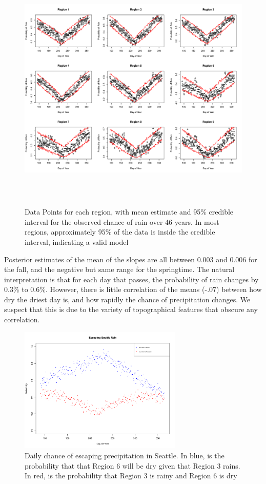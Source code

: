 \documentclass{article}
\begin{document}
\begin{figure}
\centering
\includegraphics[width = .8\textwidth, height = 12cm]{AllRegionPosterior}
\caption{Data Points for each region, with mean estimate and 95\% credible interval for the observed chance of rain over 46 years. In most regions, approximately 95\% of the data is inside the credible interval, indicating a valid model}
\label{fig:9by9}
\end{figure}
Posterior estimates of the mean of the slopes are all between 0.003 and 0.006 for the fall, and the negative but same range for the springtime. The natural interpretation is that for each day that passes, the probability of rain changes by 0.3\% to 0.6\%. However, there is little correlation of the means (-.07) between how dry the driest day is, and how rapidly the chance of precipitation changes. We suspect that this is due to the variety of topographical features that obscure any correlation. 

\begin{figure}
\centering
\includegraphics[width = .4\textwidth, height = 6cm]{Model2EscapeSeattleRain}
\caption{Daily chance of escaping precipitation in Seattle. In blue, is the probability that that Region 6 will be dry given that Region 3 rains. In red, is the probability that Region 3 is rainy and Region 6 is dry}
\label{fig:m2EscapeSeattle}
\end{figure}
\end{document}
